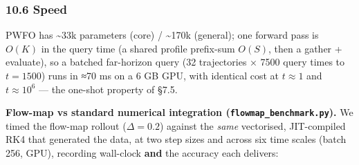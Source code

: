\documentclass[
  11pt,
]{article}
\begin{document}
\subsubsection{10.6 Speed}\label{speed}

PWFO has \textasciitilde33k parameters (core) / \textasciitilde170k
(general); one forward pass is \(O(K)\) in the query time (a shared
profile prefix-sum \(O(S)\), then a gather + evaluate), so a batched
far-horizon query (32 trajectories × 7500 query times to \(t=1500\))
runs in ≈70 ms on a 6 GB GPU, with identical cost at \(t\approx 1\) and
\(t\approx 10^6\) --- the one-shot property of §7.5.

\textbf{Flow-map vs standard numerical integration
(\texttt{flowmap\_benchmark.py}).} We timed the flow-map rollout
(\(\Delta=0.2\)) against the \emph{same} vectorised, JIT-compiled RK4
that generated the data, at two step sizes and across six time scales
(batch 256, GPU), recording wall-clock \textbf{and} the accuracy each
delivers:
\end{document}
